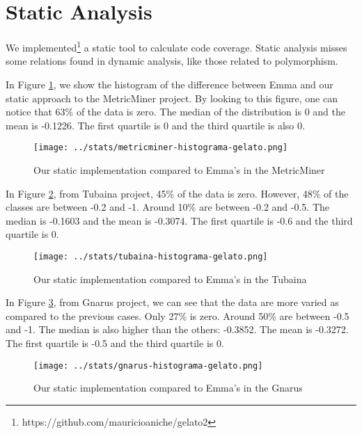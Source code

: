 \documentclass{sig-alternate}
\begin{document}
\section{Static Analysis}
\label{sec-results}

We implemented\footnote{https://github.com/mauricioaniche/gelato2} a static tool
to calculate code coverage. Static analysis misses some relations found in dynamic analysis, like those related to polymorphism.

In Figure \ref{fig:metricminer}, we show the histogram of the difference between Emma and our static approach to
the MetricMiner project. By looking to this figure, one can notice that 63\% of the data is zero. 
The median of the distribution is 0 and the mean is -0.1226. The first quartile is 0 and the
third quartile is also 0.

\begin{figure}[h!H]
  \centering
  \texttt{[image: ../stats/metricminer-histograma-gelato.png]}
  \caption{Our static implementation compared to Emma's in the MetricMiner}
  \label{fig:metricminer}
\end{figure}

In Figure \ref{fig:tubaina}, from Tubaina project, 45\% of the data is zero. 
However, 48\% of the classes are between -0.2 and -1. Around 10\% are between -0.2 and -0.5.
The median is -0.1603 and the mean is -0.3074. The first quartile is
-0.6 and the third quartile is 0.

\begin{figure}[h!H]
  \centering
  \texttt{[image: ../stats/tubaina-histograma-gelato.png]}
  \caption{Our static implementation compared to Emma's in the Tubaina}
  \label{fig:tubaina}
\end{figure}


In Figure \ref{fig:gnarus}, from Gnarus project, we can see that the data are more varied as 
compared to the previous cases. Only 27\% is zero. Around 50\% are between -0.5 and -1. 
The median is also higher than the others: -0.3852. The mean is -0.3272. The first quartile
is -0.5 and the third quartile is 0.

\begin{figure}[h!H]
  \centering
  \texttt{[image: ../stats/gnarus-histograma-gelato.png]}
  \caption{Our static implementation compared to Emma's in the Gnarus}
  \label{fig:gnarus}
\end{figure}
\end{document}
